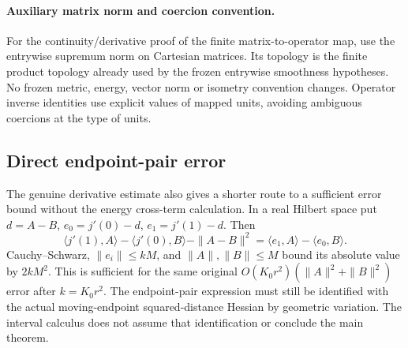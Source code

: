 \documentclass[11pt]{article}
\theoremstyle{definition}
\theoremstyle{remark}
\numberwithin{equation}{section}
\begin{document}
\paragraph{Auxiliary matrix norm and coercion convention.}
For the continuity/derivative proof of the finite matrix-to-operator map,
use the entrywise supremum norm on Cartesian matrices. Its topology is
the finite product topology already used by the frozen entrywise
smoothness hypotheses. No frozen metric, energy, vector norm or
isometry convention changes. Operator inverse identities use explicit
values of mapped units, avoiding ambiguous coercions at the type of units.

\clearpage
\subsection{Direct endpoint-pair error}
The genuine derivative estimate also gives a shorter route to a sufficient
error bound without the energy cross-term calculation. In a real Hilbert
space put $d=A-B$, $e_0=j'(0)-d$, $e_1=j'(1)-d$. Then
\[
 \langle j'(1),A\rangle-\langle j'(0),B\rangle-\|A-B\|^2
 =\langle e_1,A\rangle-\langle e_0,B\rangle.
\]
Cauchy--Schwarz, $\|e_i\|\le kM$, and $\|A\|,\|B\|\le M$ bound
its absolute value by $2kM^2$. This is sufficient for the same original
$O(K_0r^2)(\|A\|^2+\|B\|^2)$ error after $k=K_0r^2$.
The endpoint-pair expression must still be identified with the actual
moving-endpoint squared-distance Hessian by geometric variation. The interval
calculus does not assume that identification or conclude the main theorem.

\clearpage
\end{document}
